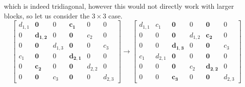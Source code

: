 \documentclass{article}
\begin{document}
which is indeed tridiagonal, however this would not directly work with larger blocks, so let us consider the $3 \times 3$ case.
\begin{equation*}
    \begin{bmatrix}
        d_{1,1}  & \mathbf{0} & 0 & \mathbf{c_{1}}  & 0 & 0 \\
        0 & \mathbf{d_{1,2}} & 0  & \mathbf{0} & c_{2}  & 0 \\
        0 & \mathbf{0} & d_{1,3} & \mathbf{0} & 0 & c_{3} \\
        c_{1} & \mathbf{0} & 0& \mathbf{d_{2,1}} & 0 & 0 \\
        0 & \mathbf{c_{2}}  & 0 & \mathbf{0} & d_{2,2}  & 0 \\
        0 & \mathbf{0} & c_{3} & \mathbf{0} & 0 & d_{2,3}
    \end{bmatrix} \longrightarrow \begin{bmatrix}
        d_{1,1}  & c_{1} & \mathbf{0} & 0 & \mathbf{0} & 0 \\
        0 & 0  & \mathbf{0} & d_{1,2} & \mathbf{c_{2}}  & 0 \\
        0 & 0 & \mathbf{d_{1,3}}& 0 & \mathbf{0} & c_{3} \\
        c_{1} & d_{2,1} & \mathbf{0}& 0 & \mathbf{0} & 0 \\
        0 & 0 & \mathbf{0} & c_{2} & \mathbf{d_{2,2}}  & 0 \\
        0 & 0 & \mathbf{c_{3}} & 0 & \mathbf{0} & d_{2,3}
    \end{bmatrix} 
\end{equation*}

\pagebreak
\end{document}
